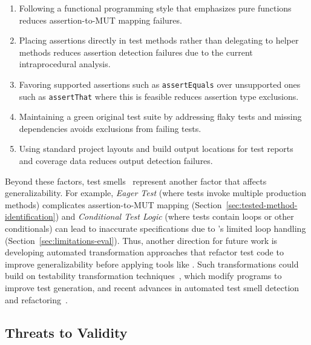 \begin{enumerate}
  \item Following a functional programming style that emphasizes pure functions
    reduces assertion-to-MUT mapping failures.
  \item Placing assertions directly in test methods rather than delegating to helper methods
    reduces assertion detection failures due to the current intraprocedural analysis.
  \item Favoring supported assertions such as \texttt{assertEquals}
    over unsupported ones such as \texttt{assertThat} where this is feasible
    reduces assertion type exclusions.
  \item Maintaining a green original test suite by addressing flaky tests and missing dependencies
    avoids exclusions from failing tests.
  \item Using standard project layouts and build output locations for test reports and coverage data
    reduces output detection failures.
\end{enumerate}

Beyond these factors,
test smells~\cite{garousi_2018_test_smells,van_deursen_2001_refactoring,meszaros_2007_xunit}
represent another factor that affects generalizability.
For example, \emph{Eager Test}
(where tests invoke multiple production methods)
complicates assertion-to-MUT mapping
(Section~\ref{sec:tested-method-identification})
and \emph{Conditional Test Logic}
(where tests contain loops or other conditionals)
can lead to inaccurate specifications
due to \ToolTeralizer{}'s limited loop handling
(Section~\ref{sec:limitations-eval}).
Thus, another direction for future work
is developing automated transformation approaches
that refactor test code to improve generalizability
before applying tools like \ToolTeralizer{}.
Such transformations could build on
testability transformation techniques~\cite{harman_2004_testability},
which modify programs to improve test generation,
and recent advances in automated test smell detection~\cite{peruma_2020_tsdetect}
and refactoring~\cite{martins_2024_catalog,xuan_2016_brefactoring}.

\subsection{Threats to Validity}%
\label{sec:threats-to-validity}

